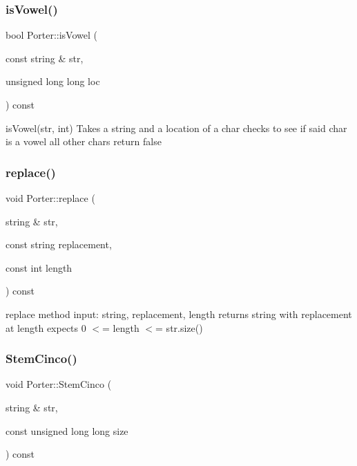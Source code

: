 \subsubsection{\texorpdfstring{is\+Vowel()}{isVowel()}}
{\footnotesize\ttfamily bool Porter\+::is\+Vowel (\begin{DoxyParamCaption}\item[{const string \&}]{str,  }\item[{unsigned long long}]{loc }\end{DoxyParamCaption}) const}

is\+Vowel(str, int) Takes a string and a location of a char checks to see if said char is a vowel all other chars return false \mbox{\label{classPorter_aba12641d0e612b264097a35e4f2ffb45}} 
\subsubsection{\texorpdfstring{replace()}{replace()}}
{\footnotesize\ttfamily void Porter\+::replace (\begin{DoxyParamCaption}\item[{string \&}]{str,  }\item[{const string}]{replacement,  }\item[{const int}]{length }\end{DoxyParamCaption}) const}

replace method input\+: string, replacement, length returns string with replacement at length expects 0 $<$= length $<$= str.\+size() \mbox{\label{classPorter_a916f45b55a1bbdaff7ce1db3d9a42813}} 
\subsubsection{\texorpdfstring{Stem\+Cinco()}{StemCinco()}}
{\footnotesize\ttfamily void Porter\+::\+Stem\+Cinco (\begin{DoxyParamCaption}\item[{string \&}]{str,  }\item[{const unsigned long long}]{size }\end{DoxyParamCaption}) const}

